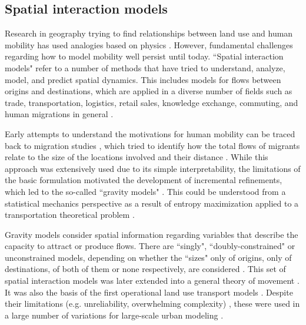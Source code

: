\subsection{Spatial interaction models}
\label{sub:ETRCO2H_1.1intro_spatial_models}

Research in geography trying to find relationships between land use and human mobility has used analogies based on physics \citep{Carey1859PrinciplesScience}.
However, fundamental challenges regarding how to model mobility well persist until today. ``Spatial interaction models" refer to a number of methods that have tried to understand, analyze, model, and predict spatial dynamics. This includes models for flows between origins and destinations, which are applied in a diverse number of fields such as trade, transportation, logistics, retail sales, knowledge exchange, commuting, and human migrations in general \citep{Sen1995GravityBehavior, Margaretic2017SpatialFlows, Thomas-Agnan2021SpatialModels}.

Early attempts to understand the motivations for human mobility can be traced back to migration studies \citep{Ravenstein1885TheMigration}, which tried to identify how the total flows of migrants relate to the size of the locations involved and their distance \citep{Erlander1990TheExtensions}. 
While this approach was extensively used due to its simple interpretability, the limitations of the basic formulation motivated the development of incremental refinements, which led to the so-called ``gravity models" \citep{Zipf1949HumanEffort., Simini2012APatterns}. 
This could be understood from a statistical mechanics perspective as a result of entropy maximization applied to a transportation theoretical problem \citep{Wilson1975SomeReview}.

Gravity models consider spatial information regarding variables that describe the capacity to attract or produce flows. There are ``singly", ``doubly-constrained" or unconstrained models, depending on whether the ``sizes" only of origins, only of destinations, of both of them or none respectively, are considered \citep{Hayes1971SpatialInteraction, Fotheringham1989SpatialApplications, Wilson1975SomeReview}.
This set of spatial interaction models was later extended into a general theory of movement \citep{Alonso1976AMovements, Fotheringham1984FurtherMovement}.  It was also the basis of the first operational land use transport models \citep{Lowry1964AMetropolis}. Despite their limitations (e.g. unreliability, overwhelming complexity) \citep{Lee1973RequiemModels}, these were used in a large number of variations for large-scale urban modeling \citep{Wegener2021Land-UseModels, Iacono2008ModelsTerritory}.

